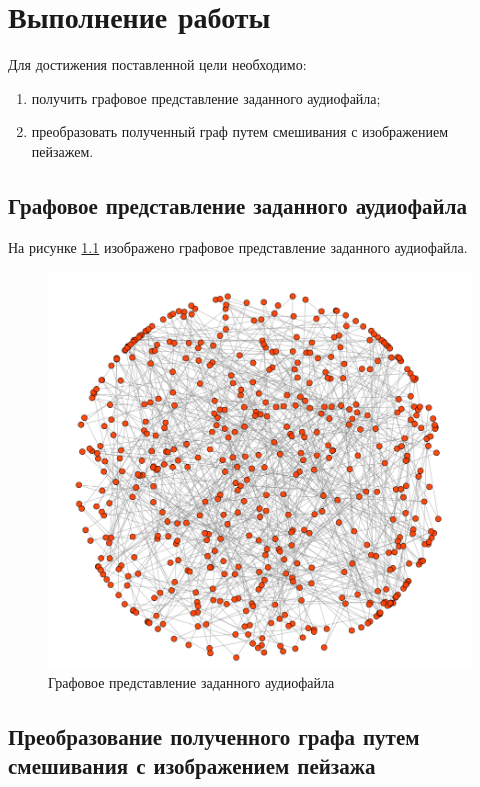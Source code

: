 \chapter{Выполнение работы}

Для достижения поставленной цели необходимо:
\begin{enumerate}
	\item получить графовое представление заданного аудиофайла;
	\item преобразовать полученный граф путем смешивания с изображением пейзажем.
\end{enumerate}

\section{Графовое представление заданного аудиофайла}

На рисунке \ref{img:graph} изображено графовое представление заданного аудиофайла.
\begin{figure}[ht!]
	\centering
	\includegraphics[width=170mm]{./img/graph1.png}
	\caption{Графовое представление заданного аудиофайла}
	\label{img:graph}
\end{figure}

\clearpage

\section{Преобразование полученного графа путем смешивания с изображением пейзажа}

